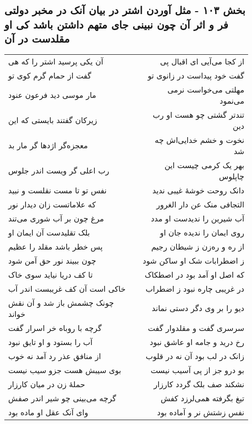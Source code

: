 \begin{center}
\section*{بخش ۱۰۳ - مثل آوردن اشتر در بیان آنک در مخبر دولتی فر و اثر آن  چون نبینی جای متهم داشتن باشد کی او مقلدست در آن}
\label{sec:sh103}
\begin{longtable}{l p{0.5cm} r}
آن یکی پرسید اشتر را که هی
&&
از کجا می‌آیی ای اقبال پی
\\
گفت از حمام گرم کوی تو
&&
گفت خود پیداست در زانوی تو
\\
مار موسی دید فرعون عنود
&&
مهلتی می‌خواست نرمی می‌نمود
\\
زیرکان گفتند بایستی که این
&&
تندتر گشتی چو هست او رب دین
\\
معجزه‌گر اژدها گر مار بد
&&
نخوت و خشم خدایی‌اش چه شد
\\
رب اعلی گر ویست اندر جلوس
&&
بهر یک کرمی چیست این چاپلوس
\\
نفس تو تا مست نقلست و نبید
&&
دانک روحت خوشهٔ غیبی ندید
\\
که علاماتست زان دیدار نور
&&
التجافی منک عن دار الغرور
\\
مرغ چون بر آب شوری می‌تند
&&
آب شیرین را ندیدست او مدد
\\
بلک تقلیدست آن ایمان او
&&
روی ایمان را ندیده جان او
\\
پس خطر باشد مقلد را عظیم
&&
از ره و ره‌زن ز شیطان رجیم
\\
چون ببیند نور حق آمن شود
&&
ز اضطرابات شک او ساکن شود
\\
تا کف دریا نیاید سوی خاک
&&
که اصل او آمد بود در اصطکاک
\\
خاکی است آن کف غریبست اندر آب
&&
در غریبی چاره نبود ز اضطراب
\\
چونک چشمش باز شد و آن نقش خواند
&&
دیو را بر وی دگر دستی نماند
\\
گرچه با روباه خر اسرار گفت
&&
سرسری گفت و مقلدوار گفت
\\
آب را بستود و او تایق نبود
&&
رخ درید و جامه او عاشق نبود
\\
از منافق عذر رد آمد نه خوب
&&
زانک در لب بود آن نه در قلوب
\\
بوی سیبش هست جزو سیب نیست
&&
بو درو جز از پی آسیب نیست
\\
حملهٔ زن در میان کارزار
&&
نشکند صف بلک گردد کارزار
\\
گرچه می‌بینی چو شیر اندر صفش
&&
تیغ بگرفته همی‌لرزد کفش
\\
وای آنک عقل او ماده بود
&&
نفس زشتش نر و آماده بود

\end{longtable}
\end{center}
